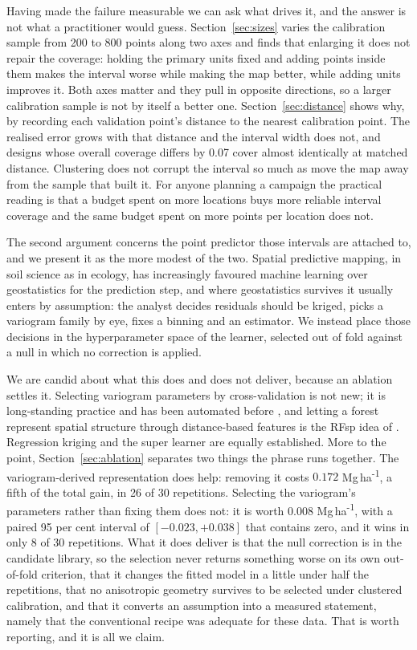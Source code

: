 \documentclass[preprint,12pt,authoryear]{elsarticle}
\newcommand{\Mgha}{Mg\,ha\textsuperscript{-1}}
\begin{document}
Having made the failure measurable we can ask what drives it, and the answer is
not what a practitioner would guess. Section~\ref{sec:sizes} varies the
calibration sample from 200 to 800 points along two axes and finds that
enlarging it does not repair the coverage: holding the primary units fixed and
adding points inside them makes the interval worse while making the map better,
while adding units improves it. Both axes matter and they pull in opposite
directions, so a larger calibration sample is not by itself a better one. Section~\ref{sec:distance} shows why, by recording each
validation point's distance to the nearest calibration point. The realised error
grows with that distance and the interval width does not, and designs whose
overall coverage differs by 0.07 cover almost identically at matched distance.
Clustering does not corrupt the interval so much as move the map away from the
sample that built it. For anyone planning a campaign the practical reading is
that a budget spent on more locations buys more reliable interval coverage and
the same budget spent on more points per location does not.

The second argument concerns the point predictor those intervals are attached
to, and we present it as the more modest of the two. Spatial predictive mapping,
in soil science \citep{mcbratney2003} as in ecology, has increasingly favoured
machine learning over geostatistics for the prediction step,
and where geostatistics survives it usually enters by assumption: the analyst
decides residuals should be kriged, picks a variogram family by eye, fixes a
binning and an estimator. We instead place those decisions in the hyperparameter
space of the learner, selected out of fold against a null in which no correction
is applied.

We are candid about what this does and does not deliver, because an ablation
settles it. Selecting variogram parameters by cross-validation is not new; it is
long-standing practice and has been automated before \citep{li2014}, and letting
a forest represent spatial structure through distance-based features is the RFsp
idea of \citet{hengl2018}. Regression kriging and the super learner
\citep{wolpert1992,vanderlaan2007} are equally established. More to the point,
Section~\ref{sec:ablation} separates two things the phrase runs together. The
variogram-derived representation does help: removing it costs $0.172$ \Mgha{},
a fifth of the total gain, in 26 of 30 repetitions. Selecting the
variogram's parameters rather than fixing them does not: it is worth $0.008$
\Mgha{}, with a paired 95 per cent interval of $[-0.023, +0.038]$ that contains
zero, and it wins in only 8 of 30 repetitions. What it does deliver is that the null
correction is in the candidate library, so the selection never returns something
worse on its own out-of-fold criterion,
that it changes the fitted model in a little under half the repetitions, that no
anisotropic geometry survives to be selected under clustered calibration, and
that it converts an assumption into a measured statement, namely that the
conventional recipe was adequate for these data. That is worth reporting, and it is all we claim.
\end{document}
